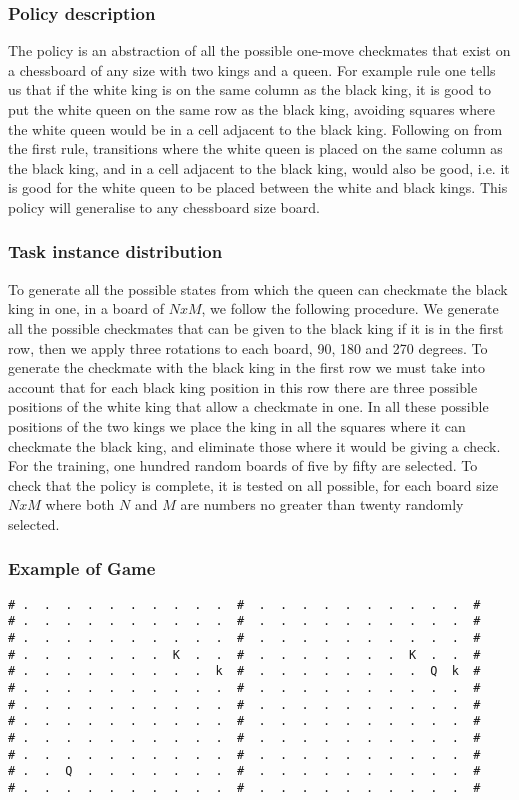 \documentclass[a4paper]{article}
\begin{document}
\subsubsection{Policy description}
The policy is an abstraction of all the possible one-move checkmates that exist on a chessboard of any size with two kings and a queen. For example rule one tells us that if the white king is on the same column as the black king, it is good to put the white queen on the same row as the black king, avoiding squares where the white queen would be in a cell adjacent to the black king. Following on from the first rule, transitions where the white queen is placed on the same column as the black king, and in a cell adjacent to the black king, would also be good, i.e. it is good for the white queen to be placed between the white and black kings. This policy will generalise to any chessboard size board.

\subsubsection{Task instance distribution}
To generate all the possible states from which the queen can checkmate the black king in one, in a board of $NxM$, we follow the following procedure. We generate all the possible checkmates that can be given to the black king if it is in the first row, then we apply three rotations to each board, 90, 180 and 270 degrees. To generate the checkmate with the black king in the first row we must take into account that for each black king position in this row there are three possible positions of the white king that allow a checkmate in one. In all these possible positions of the two kings we place the king in all the squares where it can checkmate the black king, and eliminate those where it would be giving a check. For the training, one hundred random boards of five by fifty are selected. To check that the policy is complete, it is tested on all possible, for each board size $NxM$ where both $N$ and $M$ are numbers no greater than twenty randomly selected.

\subsubsection{Example of Game}
\begin{Verbatim}[fontsize=\footnotesize]
# .  .  .  .  .  .  .  .  .  .  #  .  .  .  .  .  .  .  .  .  .  #
# .  .  .  .  .  .  .  .  .  .  #  .  .  .  .  .  .  .  .  .  .  #
# .  .  .  .  .  .  .  .  .  .  #  .  .  .  .  .  .  .  .  .  .  #
# .  .  .  .  .  .  .  K  .  .  #  .  .  .  .  .  .  .  K  .  .  #
# .  .  .  .  .  .  .  .  .  k  #  .  .  .  .  .  .  .  .  Q  k  #
# .  .  .  .  .  .  .  .  .  .  #  .  .  .  .  .  .  .  .  .  .  #
# .  .  .  .  .  .  .  .  .  .  #  .  .  .  .  .  .  .  .  .  .  #
# .  .  .  .  .  .  .  .  .  .  #  .  .  .  .  .  .  .  .  .  .  #
# .  .  .  .  .  .  .  .  .  .  #  .  .  .  .  .  .  .  .  .  .  #
# .  .  .  .  .  .  .  .  .  .  #  .  .  .  .  .  .  .  .  .  .  #
# .  .  Q  .  .  .  .  .  .  .  #  .  .  .  .  .  .  .  .  .  .  #
# .  .  .  .  .  .  .  .  .  .  #  .  .  .  .  .  .  .  .  .  .  #
\end{Verbatim}
\end{document}
